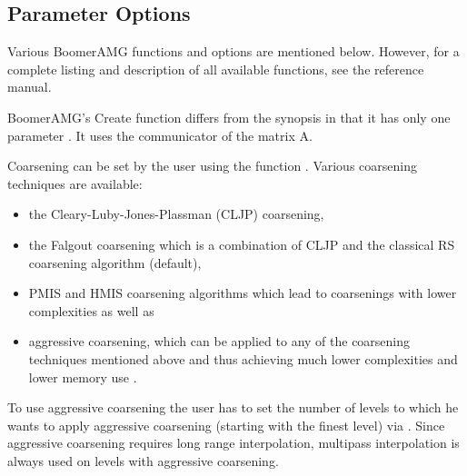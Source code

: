 \subsection{Parameter Options}

Various BoomerAMG functions and options are mentioned below. However, for a complete
listing and description of all available functions, see the reference manual.


BoomerAMG's Create function differs from the synopsis in that it has only one parameter
. It uses the communicator 
of the matrix A.

Coarsening can be set by the user using the function .
Various coarsening techniques are available:
\begin{itemize}
\item the Cleary-Luby-Jones-Plassman (CLJP) coarsening,
\item the Falgout coarsening which is a combination of CLJP and the
classical RS coarsening algorithm (default),
\item PMIS and HMIS coarsening algorithms which lead to coarsenings with lower complexities \cite{DeSterck_Yang_Heys_2004}
as well as
\item aggressive coarsening, which can be applied to any of the coarsening techniques mentioned above and thus achieving much lower complexities and lower memory use \cite{Stueben_1999}.
\end{itemize}
To use aggressive coarsening the user has to set the number of levels to which he wants to apply
aggressive coarsening (starting with the finest level) 
via . Since aggressive coarsening requires long range
interpolation, multipass interpolation is always used on levels with aggressive coarsening.

